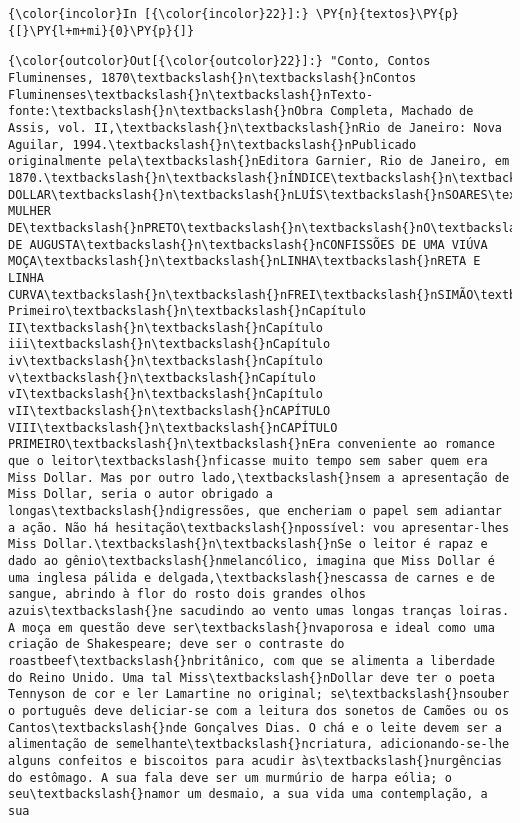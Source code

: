     \begin{Verbatim}[commandchars=\\\{\}]
{\color{incolor}In [{\color{incolor}22}]:} \PY{n}{textos}\PY{p}{[}\PY{l+m+mi}{0}\PY{p}{]}
\end{Verbatim}

            \begin{Verbatim}[commandchars=\\\{\}]
{\color{outcolor}Out[{\color{outcolor}22}]:} "Conto, Contos Fluminenses, 1870\textbackslash{}n\textbackslash{}nContos Fluminenses\textbackslash{}n\textbackslash{}nTexto-fonte:\textbackslash{}n\textbackslash{}nObra Completa, Machado de Assis, vol. II,\textbackslash{}n\textbackslash{}nRio de Janeiro: Nova Aguilar, 1994.\textbackslash{}n\textbackslash{}nPublicado originalmente pela\textbackslash{}nEditora Garnier, Rio de Janeiro, em 1870.\textbackslash{}n\textbackslash{}nÍNDICE\textbackslash{}n\textbackslash{}nMISS DOLLAR\textbackslash{}n\textbackslash{}nLUÍS\textbackslash{}nSOARES\textbackslash{}n\textbackslash{}nA MULHER DE\textbackslash{}nPRETO\textbackslash{}n\textbackslash{}nO\textbackslash{}nSEGREDO DE AUGUSTA\textbackslash{}n\textbackslash{}nCONFISSÕES DE UMA VIÚVA MOÇA\textbackslash{}n\textbackslash{}nLINHA\textbackslash{}nRETA E LINHA CURVA\textbackslash{}n\textbackslash{}nFREI\textbackslash{}nSIMÃO\textbackslash{}n\textbackslash{}nMISS\textbackslash{}nDOLLAR\textbackslash{}n\textbackslash{}nÍNDICE\textbackslash{}n\textbackslash{}nCapítulo Primeiro\textbackslash{}n\textbackslash{}nCapítulo II\textbackslash{}n\textbackslash{}nCapítulo iii\textbackslash{}n\textbackslash{}nCapítulo iv\textbackslash{}n\textbackslash{}nCapítulo v\textbackslash{}n\textbackslash{}nCapítulo vI\textbackslash{}n\textbackslash{}nCapítulo vII\textbackslash{}n\textbackslash{}nCAPÍTULO VIII\textbackslash{}n\textbackslash{}nCAPÍTULO PRIMEIRO\textbackslash{}n\textbackslash{}nEra conveniente ao romance que o leitor\textbackslash{}nficasse muito tempo sem saber quem era Miss Dollar. Mas por outro lado,\textbackslash{}nsem a apresentação de Miss Dollar, seria o autor obrigado a longas\textbackslash{}ndigressões, que encheriam o papel sem adiantar a ação. Não há hesitação\textbackslash{}npossível: vou apresentar-lhes Miss Dollar.\textbackslash{}n\textbackslash{}nSe o leitor é rapaz e dado ao gênio\textbackslash{}nmelancólico, imagina que Miss Dollar é uma inglesa pálida e delgada,\textbackslash{}nescassa de carnes e de sangue, abrindo à flor do rosto dois grandes olhos azuis\textbackslash{}ne sacudindo ao vento umas longas tranças loiras. A moça em questão deve ser\textbackslash{}nvaporosa e ideal como uma criação de Shakespeare; deve ser o contraste do roastbeef\textbackslash{}nbritânico, com que se alimenta a liberdade do Reino Unido. Uma tal Miss\textbackslash{}nDollar deve ter o poeta Tennyson de cor e ler Lamartine no original; se\textbackslash{}nsouber o português deve deliciar-se com a leitura dos sonetos de Camões ou os Cantos\textbackslash{}nde Gonçalves Dias. O chá e o leite devem ser a alimentação de semelhante\textbackslash{}ncriatura, adicionando-se-lhe alguns confeitos e biscoitos para acudir às\textbackslash{}nurgências do estômago. A sua fala deve ser um murmúrio de harpa eólia; o seu\textbackslash{}namor um desmaio, a sua vida uma contemplação, a sua 
\end{Verbatim}
